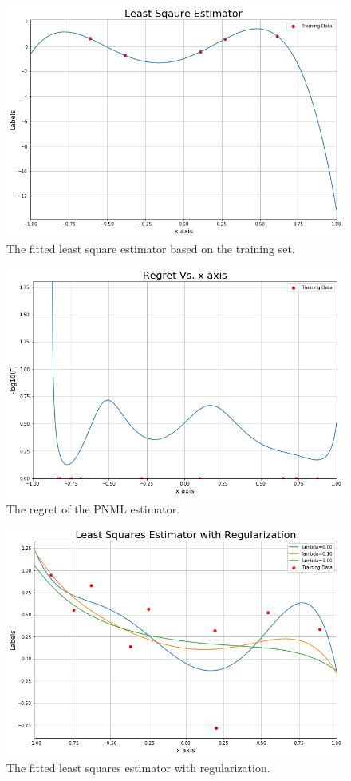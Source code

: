 \documentclass[final,1p,times]{elsarticle}
\begin{document}
\begin{figure}[h] 
\centering\includegraphics[width=0.6\linewidth]{least_squares_plot.png}
\caption{The fitted least square estimator based on the training set.}
\label{fig:least_squares}
\end{figure}

\begin{figure}[h]
\centering\includegraphics[width=0.6\linewidth]{regret_plot.png}
\caption{The regret of the PNML estimator.}
\label{fig:regret}
\end{figure}

\begin{figure}[h] 
\centering\includegraphics[width=0.6\linewidth]{least_squares_with_reg_plot.png}
\caption{The fitted least squares estimator with regularization.}
\label{fig:least_squares_with_reg}
\end{figure}
\end{document}
